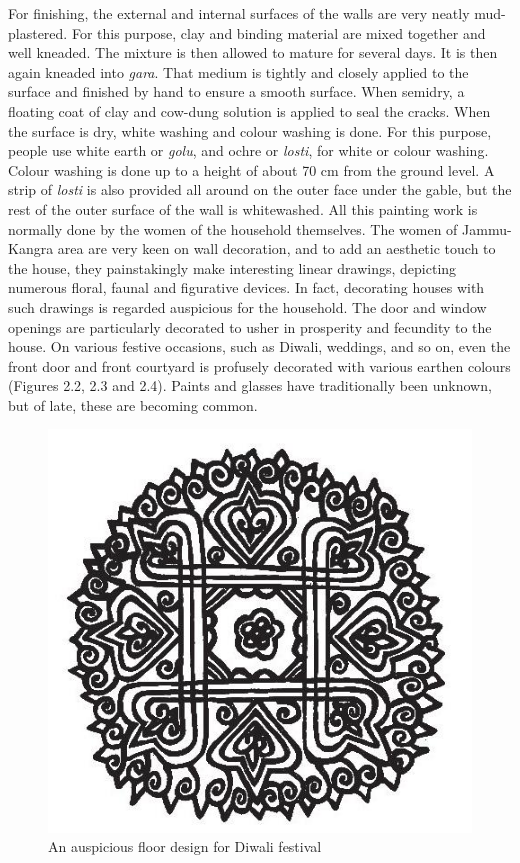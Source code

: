 For finishing, the external and internal surfaces of the walls are very neatly mud-plastered. For this purpose, clay and binding material are mixed together and well kneaded. The mixture is then allowed to mature for several days. It is then again kneaded into \textit{gara}. That medium is tightly and closely applied to the surface and finished by hand to ensure a smooth surface. When semidry, a floating coat of clay and cow-dung solution is applied to seal the cracks. When the surface is dry, white washing and colour washing is done. For this purpose, people use white earth or \textit{golu}, and ochre or \textit{losti}, for white or colour washing. Colour washing is done up to a height of about 70 cm from the ground level. A strip of \textit{losti} is also provided all around on the outer face under the gable, but the rest of the outer surface of the wall is whitewashed. All this painting work is normally done by the women of the household themselves. The women of Jammu-Kangra area are very keen on wall decoration, and to add an aesthetic touch to the house, they painstakingly make interesting linear drawings, depicting numerous floral, faunal and figurative devices. In fact, decorating houses with such drawings is regarded auspicious for the household. The door and window openings are particularly decorated to usher in prosperity and fecundity to the house. On various festive occasions, such as Diwali, weddings, and so on, even the front door and front courtyard is profusely decorated with various earthen colours (Figures 2.2, 2.3 and 2.4). Paints and glasses have traditionally been unknown, but of late, these are becoming common.

\begin{figure}[!htbp]
\includegraphics[scale=.4]{images/chap02-02.jpg}
\caption{An auspicious floor design for Diwali festival}\label{chap02-fig02}
\end{figure}


